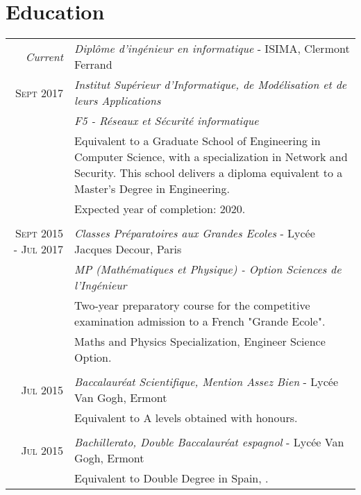 \documentclass[a4paper,10pt]{article}
\begin{document}
\section{Education}
\begin{tabular}{r|p{11cm}}
 \emph{Current} & \emph{Diplôme d'ingénieur en informatique} - ISIMA, Clermont Ferrand \\\textsc{Sept 2017}&\emph{Institut Supérieur d'Informatique, de Modélisation et de leurs Applications}\\&\emph{F5 - Réseaux et Sécurité informatique}\\&\footnotesize{Equivalent to a Graduate School of Engineering in Computer Science, with a specialization in Network and Security. This school delivers a diploma equivalent to a Master’s Degree in Engineering.} \\ & \footnotesize{Expected
year of completion: 2020.}\\\multicolumn{2}{c}{} \\
 \textsc{Sept 2015 - Jul 2017} & \emph{Classes Préparatoires aux Grandes Ecoles} - Lycée Jacques Decour, Paris\\&\emph{MP (Mathématiques et Physique) - Option Sciences de l'Ingénieur}\\&\footnotesize{Two-year preparatory course for the competitive examination admission to a French "Grande Ecole". }\\&\footnotesize{Maths and Physics Specialization, Engineer Science Option.}\\\multicolumn{2}{c}{} \\
\textsc{Jul 2015} & \emph{Baccalauréat Scientifique, Mention Assez Bien} - Lycée Van Gogh, Ermont \\&\footnotesize{Equivalent to A levels obtained with honours.}\\\multicolumn{2}{c}{} \\
\textsc{Jul 2015} & \emph{Bachillerato, Double Baccalauréat espagnol} - Lycée Van Gogh, Ermont \\&\footnotesize{Equivalent to Double Degree in Spain, .}
\end{tabular}

\end{document}

